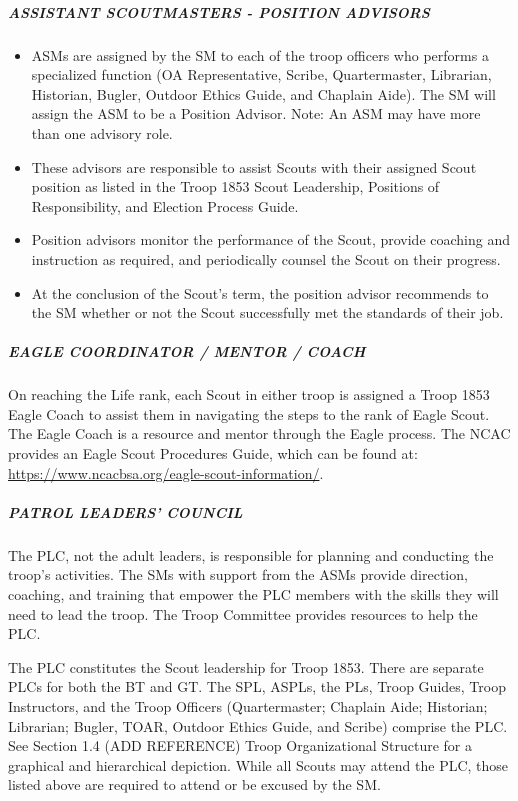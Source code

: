\documentclass{ltxguide}
\begin{document}
\subparagraph{ASSISTANT SCOUTMASTERS - POSITION ADVISORS}
\begin{itemize}
	\item \acp{ASM} are assigned by the \ac{SM} to each of the troop officers who performs a specialized function (\ac{OA} Representative, Scribe, Quartermaster, Librarian, Historian, Bugler, Outdoor Ethics Guide, and Chaplain Aide). The \ac{SM} will assign the \ac{ASM} to be a Position Advisor. Note: An \ac{ASM} may have more than one advisory role.
	\item These advisors are responsible to assist Scouts with their assigned Scout position as listed in the Troop 1853 Scout Leadership, Positions of Responsibility, and Election Process Guide.
	\item Position advisors monitor the performance of the Scout, provide coaching and instruction as required, and periodically counsel the Scout on their progress.
	\item At the conclusion of the Scout's term, the position advisor recommends to the \ac{SM} whether or not the Scout successfully met the standards of their job.
\end{itemize}

\subparagraph{EAGLE COORDINATOR / MENTOR / COACH}
On reaching the Life rank, each Scout in either troop is assigned a Troop 1853 Eagle Coach to assist them in navigating the steps to the rank of Eagle Scout. The Eagle Coach is a resource and mentor through the Eagle process. The \ac{NCAC} provides an Eagle Scout Procedures Guide, which can be found at: \url{https://www.ncacbsa.org/eagle-scout-information/}.

\subparagraph{PATROL LEADERS' COUNCIL} 
The \ac{PLC}, not the adult leaders, is responsible for planning and conducting the troop's activities. The \acp{SM} with support from the \acp{ASM} provide direction, coaching, and training that empower the \ac{PLC} members with the skills they will need to lead the troop. The Troop Committee provides resources to help the \ac{PLC}.

The \ac{PLC} constitutes the Scout leadership for Troop 1853. There are separate \acp{PLC} for both the \ac{BT} and \ac{GT}. The \ac{SPL}, \acp{ASPL}, the \acp{PL}, Troop Guides, Troop Instructors, and the Troop Officers (Quartermaster; Chaplain Aide; Historian; Librarian; Bugler, \ac{TOAR}, Outdoor Ethics Guide, and Scribe) comprise the \ac{PLC}. See Section 1.4 (ADD REFERENCE) Troop Organizational Structure for a graphical and hierarchical depiction. While all Scouts may attend the \ac{PLC}, those listed above are required to attend or be excused by the \ac{SM}.
\end{document}
